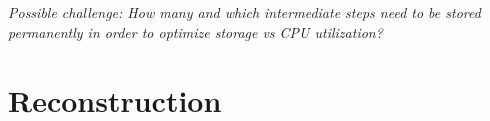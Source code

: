\documentclass[../main-v1.tex]{subfiles}
\begin{document}
{\it Possible challenge:  How many and which intermediate steps need to be stored permanently in order to optimize storage vs CPU utilization?}



\section{Reconstruction }







    




\end{document}
